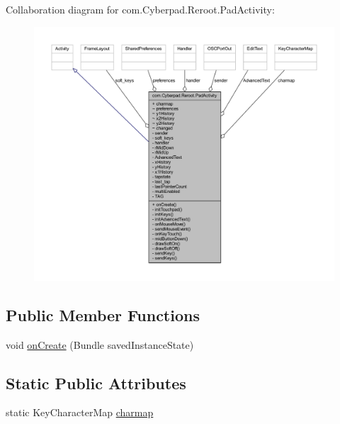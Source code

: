\-Collaboration diagram for com.\-Cyberpad.\-Reroot.\-Pad\-Activity\-:\nopagebreak
\begin{figure}[H]
\begin{center}
\leavevmode
\includegraphics[width=350pt]{classcom_1_1_cyberpad_1_1_reroot_1_1_pad_activity__coll__graph}
\end{center}
\end{figure}
\subsection*{\-Public \-Member \-Functions}
\begin{DoxyCompactItemize}
\item 
void \hyperlink{classcom_1_1_cyberpad_1_1_reroot_1_1_pad_activity_a41d635b80b8eab8b90b2ca4bc6081d78}{on\-Create} (\-Bundle saved\-Instance\-State)
\end{DoxyCompactItemize}
\subsection*{\-Static \-Public \-Attributes}
\begin{DoxyCompactItemize}
\item 
static \-Key\-Character\-Map \hyperlink{classcom_1_1_cyberpad_1_1_reroot_1_1_pad_activity_a1e267b2481ca6a48520d8221ab648e14}{charmap}
\end{DoxyCompactItemize}
